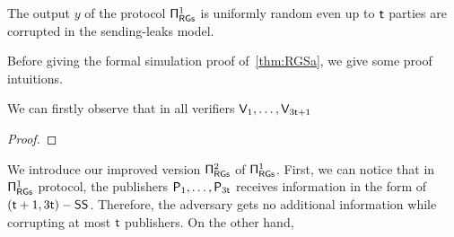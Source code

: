 \begin{theorem}\label{thm:RGSa}
    The output $y$ of the protocol $\mathsf{\Pi}_{\mathsf{RGs}}^{1}$ is uniformly random even up to $\mathsf{t}$ parties are corrupted in the sending-leaks model. 
\end{theorem}

Before giving the formal simulation proof of~\cref{thm:RGSa}, we give some proof intuitions. 

We can firstly observe that in all verifiers $\mathsf{V}_1, \ldots, \mathsf{V}_{3\mathsf{t}+1}$



\begin{proof}
    

\end{proof}

We introduce our improved version $\mathsf{\Pi}_{\mathsf{RGs}}^2$ of $\mathsf{\Pi}_{\mathsf{RGs}}^{1}$. First, we can notice that in $\mathsf{\Pi}_{\mathsf{RGs}}^{1}$ protocol, the publishers $\mathsf{P}_1, \ldots, \mathsf{P}_{3\mathsf{t}}$ receives information in the form of $(\mathsf{t}+1, 3\mathsf{t})-\mathsf{SS}$. Therefore, the adversary gets no additional information while corrupting at most $\mathsf{t}$ publishers. On the other hand, 





